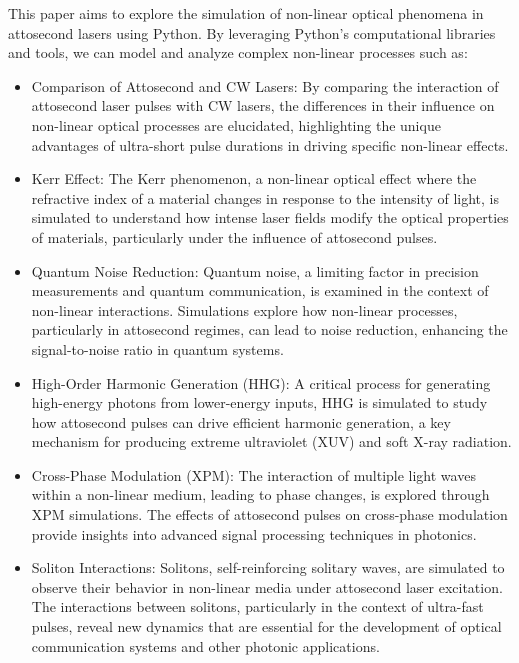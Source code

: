 \documentclass[12pt]{article}
\begin{document}
This paper aims to explore the simulation of non-linear optical phenomena in attosecond lasers using Python. By leveraging Python's computational libraries and tools, we can model and analyze complex non-linear processes such as:
\begin{itemize}
    \item Comparison of Attosecond and CW Lasers: By comparing the interaction of attosecond laser pulses with CW lasers, the differences in their influence on non-linear optical processes are elucidated, highlighting the unique advantages of ultra-short pulse durations in driving specific non-linear effects.

    \item Kerr Effect: The Kerr phenomenon, a non-linear optical effect where the refractive index of a material changes in response to the intensity of light, is simulated to understand how intense laser fields modify the optical properties of materials, particularly under the influence of attosecond pulses.
    
    \item Quantum Noise Reduction: Quantum noise, a limiting factor in precision measurements and quantum communication, is examined in the context of non-linear interactions. Simulations explore how non-linear processes, particularly in attosecond regimes, can lead to noise reduction, enhancing the signal-to-noise ratio in quantum systems.
    
    \item High-Order Harmonic Generation (HHG): A critical process for generating high-energy photons from lower-energy inputs, HHG is simulated to study how attosecond pulses can drive efficient harmonic generation, a key mechanism for producing extreme ultraviolet (XUV) and soft X-ray radiation.
    
    \item Cross-Phase Modulation (XPM): The interaction of multiple light waves within a non-linear medium, leading to phase changes, is explored through XPM simulations. The effects of attosecond pulses on cross-phase modulation provide insights into advanced signal processing techniques in photonics.
    
    \item Soliton Interactions: Solitons, self-reinforcing solitary waves, are simulated to observe their behavior in non-linear media under attosecond laser excitation. The interactions between solitons, particularly in the context of ultra-fast pulses, reveal new dynamics that are essential for the development of optical communication systems and other photonic applications.
\end{itemize}
\end{document}

